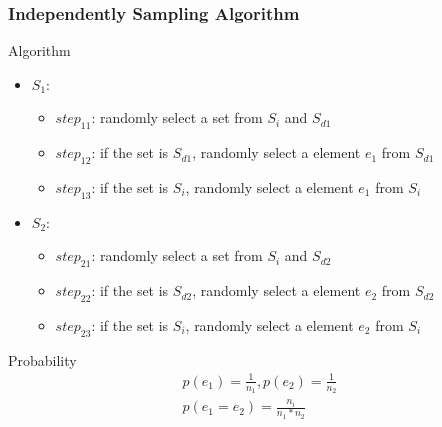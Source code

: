 \documentclass[notheorems, aspectratio=54]{beamer}
\begin{document}
\begin{frame}
    \frametitle{Independently Sampling Algorithm}
    \begin{block}{Algorithm}
        \begin{itemize}
            \item $S_1$:
            \begin{itemize}
                \item $step_{11}$: randomly select a set from $S_i$ and $S_{d1}$
                \item $step_{12}$: if the set is $S_{d1}$, randomly select a element $e_1$ from $S_{d1}$
                \item $step_{13}$: if the set is $S_i$, randomly select a element $e_1$ from $S_i$
            \end{itemize}
            \item $S_2$:
            \begin{itemize}
                \item $step_{21}$: randomly select a set from $S_i$ and $S_{d2}$
                \item $step_{22}$: if the set is $S_{d2}$, randomly select a element $e_2$ from $S_{d2}$
                \item $step_{23}$: if the set is $S_i$, randomly select a element $e_2$ from $S_i$
            \end{itemize}
        \end{itemize}
    \end{block}
    \begin{block}{Probability}
        \begin{equation}
            \begin{aligned}
                p(e_1) = \frac{1}{n_1},p(e_2) = \frac{1}{n_2}\\
                p(e_1 = e_2) = \frac{n_i}{n_1*n_2}
            \end{aligned}
        \end{equation}
    \end{block}
\end{frame}
\end{document}
